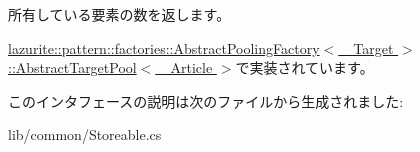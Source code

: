所有している要素の数を返します。 

\hyperlink{classlazurite_1_1pattern_1_1factories_1_1_abstract_pooling_factory_3_01___target_01_4_1_1_abstra513b29652c04fa77de240c337e958a8d_aae51e859cb8f4ce8f15dd3db69046711}{lazurite::pattern::factories::AbstractPoolingFactory$<$ \_\-Target $>$::AbstractTargetPool$<$ \_\-Article $>$}で実装されています。

このインタフェースの説明は次のファイルから生成されました:\begin{DoxyCompactItemize}
\item 
lib/common/Storeable.cs\end{DoxyCompactItemize}
